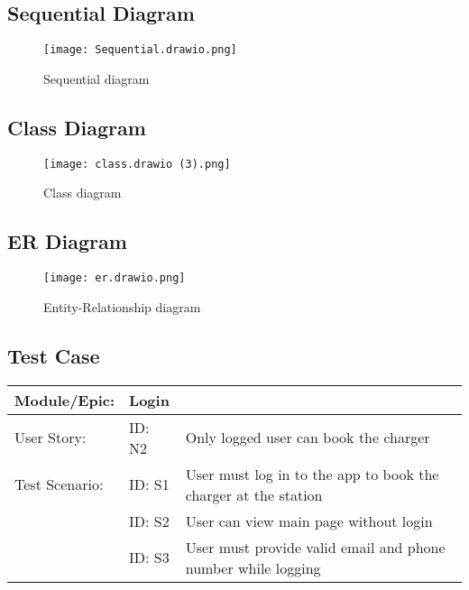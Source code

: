 \newpage
\subsection{Sequential Diagram}
\vspace{1in}
\begin{figure}[h]
    \centering
    \texttt{[image: Sequential.drawio.png]}
    \caption{Sequential diagram}
    \label{Figure 7: Sequential Diagram}
\end{figure}

\newpage
\subsection{Class Diagram}
\vspace{1in}
\begin{figure}[h]
    \centering
    \texttt{[image: class.drawio (3).png]}
    \caption{Class diagram}
    \label{Figure 8: Class Diagram}
\end{figure}


\newpage
\subsection{ER Diagram}
\vspace{1in}
\begin{figure}[h]
    \centering
    \texttt{[image: er.drawio.png]}
    \caption{Entity-Relationship diagram}
    \label{Figure 9: Entity-Relationship Diagram}
\end{figure}

\newpage
\subsection{Test Case}
\vspace{0.5in}
\begin{table}[!ht]
    \centering
    \begin{tabular}{|l|l|l|}
    \hline
        Module/Epic: & Login & ~ \\ \hline
        User Story: & ID: N2 & Only logged user can book the charger \\ \hline
        Test Scenario: & ID: S1 & User must log in to the app to book the charger at the station \\ \hline
        ~ & ID: S2 & User can view main page without login  \\ \hline
        ~ & ID: S3 & User must provide valid email and phone number while logging \\ \hline
    \end{tabular}
\end{table}

